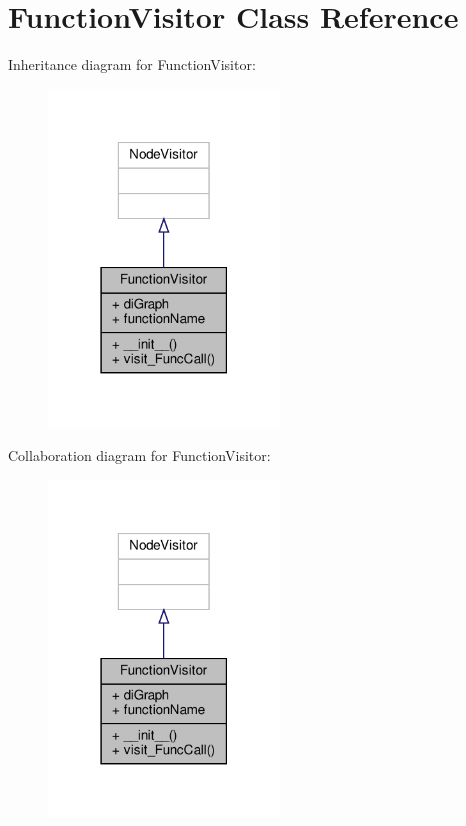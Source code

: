 \hypertarget{classVisitors_1_1FunctionVisitor}{}\section{Function\+Visitor Class Reference}
\label{classVisitors_1_1FunctionVisitor}


Inheritance diagram for Function\+Visitor\+:\nopagebreak
\begin{figure}[H]
\begin{center}
\leavevmode
\includegraphics[width=174pt]{classVisitors_1_1FunctionVisitor__inherit__graph}
\end{center}
\end{figure}


Collaboration diagram for Function\+Visitor\+:\nopagebreak
\begin{figure}[H]
\begin{center}
\leavevmode
\includegraphics[width=174pt]{classVisitors_1_1FunctionVisitor__coll__graph}
\end{center}
\end{figure}
